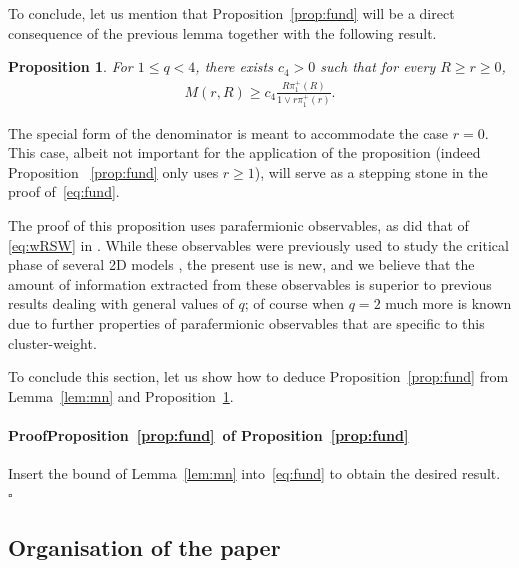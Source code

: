 \documentclass[a4paper,oneside,11pt]{article}
\newtheorem{proposition}[theorem]{Proposition}
\numberwithin{equation}{section}
\numberwithin{equation}{section}
\numberwithin{equation}{section}
\newenvironment{proof}[1][\relax]%
  {\paragraph{Proof\ifx#1\relax\else~of #1\fi}}%
  {~\hfill$\square$\par\bigskip}
\begin{document}
To conclude, let us mention that Proposition~\ref{prop:fund} will be a direct consequence of the previous lemma together with the following result.

\begin{proposition}\label{prop:10}
	For $1\le q< 4$, there exists $c_4>0$ such that for every $R\ge r\ge0$,
	\begin{align}\label{eq:fund}
		M(r,R) \ge c_4\frac{R\pi_1^+(R)}{1\vee r\pi_1^+(r)}.
	\end{align}
\end{proposition}
The special form of the denominator is meant to accommodate the case $r = 0$. 
This case, albeit not important for the application of the proposition (indeed Proposition ~\ref{prop:fund} only uses $r \geq 1$), 
will serve as a stepping stone in the proof of~\eqref{eq:fund}.

The proof of this proposition uses parafermionic observables, as did that of \eqref{eq:wRSW} in \cite{DumSidTas16}. While these observables were previously used to study the critical phase of several 2D models \cite{Smi10,DumSidTas16,BefDumSmi15,DumSmi12,DumGla18}, the present use is new, and we believe that the amount of information extracted from these observables is superior to previous results dealing with general values of $q$; of course when $q=2$ much more is known due to further properties of parafermionic observables that are specific to this cluster-weight.

To conclude this section, let us show how to deduce Proposition~\ref{prop:fund} from Lemma~\ref{lem:mn} and Proposition~\ref{prop:10}.
\begin{proof}[Proposition~\ref{prop:fund}]
	Insert the bound of Lemma~\ref{lem:mn} into~\eqref{eq:fund} to obtain the desired result. 	
\end{proof}


\subsection{Organisation of the paper}
\end{document}
